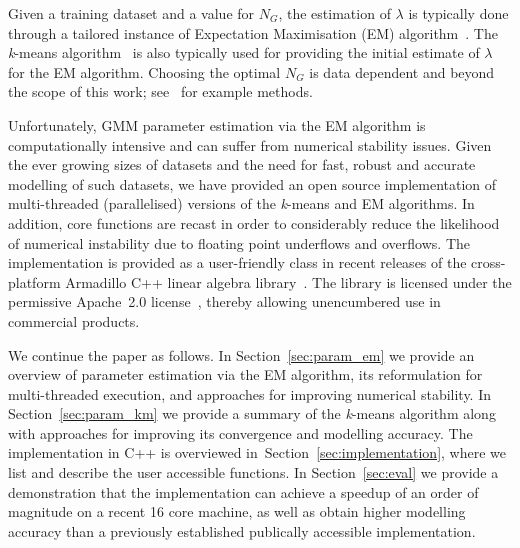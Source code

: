 Given a training dataset and a value for $N_G$,
the estimation of $\lambda$ is typically done through a
tailored instance of Expectation Maximisation (EM) algorithm~\cite{Dempster77, McLachlan-2008, Moon96, Redner84}.
The {\it k}-means algorithm~\cite{Bishop_2006,Duda01,Linde80} is also typically used for providing the initial estimate of $\lambda$ for the EM algorithm.
Choosing the optimal $N_G$ is data dependent and beyond the scope of this work; see~\cite{Hamerly_2003,Pelleg_2000} for example methods.

Unfortunately, GMM parameter estimation via the EM algorithm is computationally intensive
and can suffer from numerical stability issues.
Given the ever growing sizes of datasets and the need for fast, robust and accurate modelling of such datasets,
we have provided an open source implementation of multi-threaded (parallelised) versions 
of the \mbox{{\it k}-means} and EM algorithms.
In addition, core functions are recast in order to considerably reduce the likelihood of numerical instability due to floating point underflows and overflows.
The implementation is provided as a user-friendly class in recent releases of the cross-platform Armadillo C++ linear algebra library~\cite{Armadillo_JOSS_2016}.
The library is licensed under the permissive Apache~2.0 license~\cite{Laurent_2008},
thereby allowing unencumbered use in commercial products.

We continue the paper as follows.
In Section~\ref{sec:param_em} we provide an overview of parameter estimation via the EM algorithm,
its reformulation for multi-threaded execution,
and approaches for improving numerical stability.
In Section~\ref{sec:param_km} we provide a summary of the {\it k}-means algorithm
along with approaches for improving its convergence and modelling accuracy.
The implementation in C++ is overviewed in~Section~\ref{sec:implementation},
where we list and describe the user accessible functions.
In Section~\ref{sec:eval}
we provide a demonstration that the implementation can achieve a speedup of an order of magnitude on a recent 16 core machine,
as well as obtain higher modelling accuracy than a previously established publically accessible implementation.




